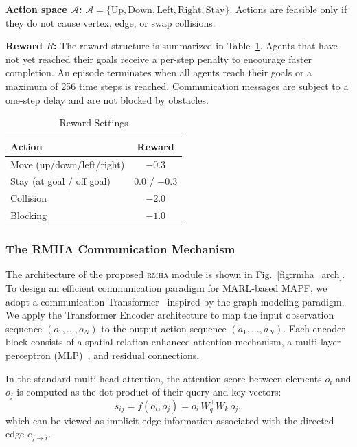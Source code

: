 \documentclass[sigconf]{acmart}
\newcommand{\rmha}{\textsc{rmha}}
\begin{document}
\textbf{Action space $\mathcal{A}$:}
$\mathcal{A}=\{\text{Up}, \text{Down}, \text{Left}, \text{Right},
\text{Stay}\}$.
Actions are feasible only if they do not cause vertex, edge, or
swap collisions.

\textbf{Reward $R$:}
The reward structure is summarized in Table~\ref{tab:reward}.
Agents that have not yet reached their goals receive a per-step
penalty to encourage faster completion.
An episode terminates when all agents reach their goals or a
maximum of 256 time steps is reached.
Communication messages are subject to a one-step delay and are not
blocked by obstacles.

\begin{table}[t]
\centering
\caption{Reward Settings}
\label{tab:reward}
\begin{tabular}{lc}
\toprule
\textbf{Action} & \textbf{Reward} \\
\midrule
Move (up/down/left/right) & $-0.3$ \\
Stay (at goal / off goal) & $0.0$ / $-0.3$ \\
Collision & $-2.0$ \\
Blocking & $-1.0$ \\
\bottomrule
\end{tabular}
\end{table}

\subsubsection{The RMHA Communication Mechanism}

The architecture of the proposed \rmha{} module is shown in
Fig.~\ref{fig:rmha_arch}.
To design an efficient communication paradigm for MARL-based
MAPF, we adopt a communication
Transformer~\cite{wang2025transformer,xiong2025ropt,lee2024mission}
inspired by the graph modeling paradigm.
We apply the Transformer Encoder architecture to map the input
observation sequence $(o_1,\ldots,o_N)$ to the output action
sequence $(a_1,\ldots,a_N)$.
Each encoder block consists of a spatial relation-enhanced
attention mechanism, a multi-layer perceptron
(MLP)~\cite{aina2025mlp,wang2025mlp,ouaret2025mlp}, and residual
connections.

In the standard multi-head attention, the attention score between
elements $o_i$ and $o_j$ is computed as the dot product of their
query and key vectors:
\begin{equation}\label{eq:vanilla_attn}
  s_{ij} = f(o_i, o_j) = o_i\, W_q^\top W_k\, o_j,
\end{equation}
which can be viewed as implicit edge information associated with
the directed edge $e_{j\to i}$.
\end{document}

